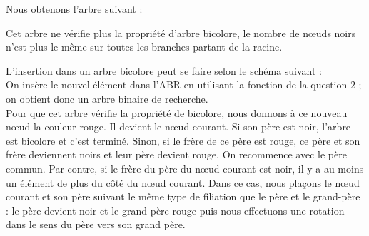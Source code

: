 Nous obtenons l'arbre suivant :
\medskip

\bigskip

Cet arbre ne vérifie plus la propriété d'arbre bicolore, le nombre de nœuds noirs n'est plus le même sur toutes les branches partant de la racine.

\Q
L'insertion dans un arbre bicolore peut se faire selon le schéma suivant :\\
On insère le nouvel élément dans l'ABR en utilisant la fonction de la question 2 ; on obtient donc un arbre binaire de recherche.\\
Pour que cet arbre vérifie la propriété de bicolore, nous donnons à ce nouveau nœud la couleur rouge. Il devient le nœud courant. Si son père est noir, l'arbre est bicolore et c'est terminé. Sinon, si le frère de ce père est rouge, ce père et son frère deviennent noirs et leur père devient rouge. On recommence avec le père commun. Par contre, si le frère du père du nœud courant est noir, il y a au moins un élément de plus du côté du nœud courant. Dans ce cas, nous plaçons le nœud courant et son père suivant le même type de filiation que le père et le grand-père : le père devient noir et le grand-père rouge puis nous effectuons une rotation dans le sens du père vers son grand père.
\smallskip

